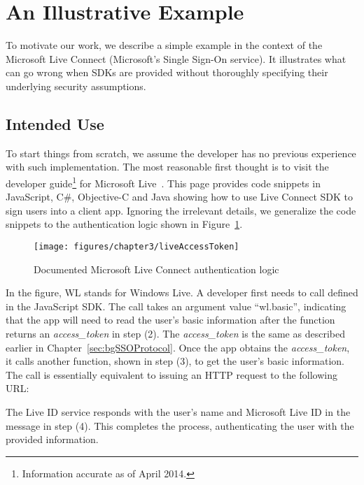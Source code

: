 \section{An Illustrative Example}
\label{sec:explicatingIllustrativeExample}

To motivate our work, we describe a simple example in the context of the Microsoft Live Connect (Microsoft's Single Sign-On service). It illustrates what can go wrong when SDKs are provided without thoroughly specifying their underlying security assumptions.   

\subsection{Intended Use}

To start things from scratch, we assume the developer has no previous experience with such implementation.  The most reasonable first thought is to visit the developer guide\footnote{Information accurate as of April 2014.} for Microsoft Live~\cite{LiveConnectDoc}.  This page provides code snippets in JavaScript, C\#, Objective-C and Java showing how to use Live Connect SDK to sign users into a client app.  Ignoring the irrelevant details, we generalize the code snippets to the authentication logic shown in Figure~\ref{fig:liveAccessToken}.

\begin{figure}[hbt]
\centering
\texttt{[image: figures/chapter3/liveAccessToken]}
\caption{Documented Microsoft Live Connect authentication logic}
\label{fig:liveAccessToken}
\end{figure}

In the figure, WL stands for Windows Live. A developer first needs to call  defined in the JavaScript SDK. The call takes an argument value ``wl.basic'', indicating that the app will need to read the user's basic information after the function returns an \emph{access\_token} in step (2).  The \emph{access\_token} is the same as described earlier in Chapter~\ref{sec:bgSSOProtocol}.  Once the app obtains the \emph{access\_token}, it calls another function, shown in step (3), to get the user's basic information.  The call is essentially equivalent to issuing an HTTP request to the following URL:

\setlength{\fboxrule}{0pt}

The Live ID service responds with the user's name and Microsoft Live ID in the message in step (4). This completes the process, authenticating the user with the provided information. 

